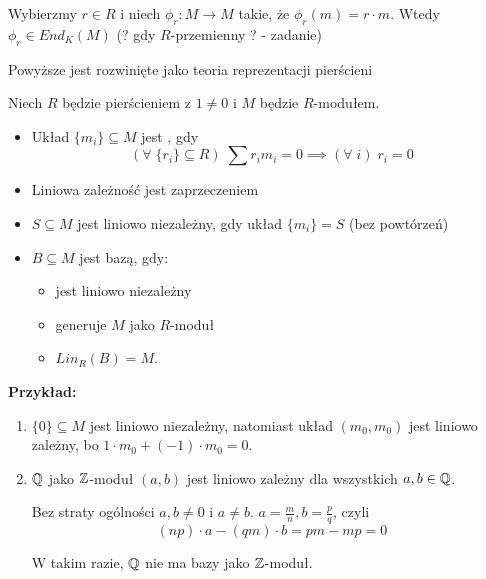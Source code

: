 Wybierzmy $r\in R$ i niech $\phi_r:M\to M$ takie, że $\phi_r(m)=r\cdot m$. Wtedy $\phi_r\in End_K(M)$ (? gdy $R$-przemienny ? - zadanie)

\begin{center}\end{center}

Powyższe jest rozwinięte jako teoria reprezentacji pierścieni

\begin{bbox}
Niech $R$ będzie pierścieniem z $1\neq 0$ i $M$ będzie $R$-modułem.

\begin{itemize}%
    \item[\PHtunny] Układ $\{m_i\}\subseteq M$ jest , gdy
    $$(\forall\;\{r_i\}\subseteq R)\;\sum r_im_i=0\implies(\forall\;i)\;r_i=0$$
    \item[\PHtunny] Liniowa zależność jest zaprzeczeniem
    \item[\PHtunny] $S\subseteq M$ jest liniowo niezależny, gdy układ $\{m_i\}=S$ (bez powtórzeń)
    \item[\PHtunny] $B\subseteq M$ jest bazą, gdy:
    \begin{itemize}
        \item jest liniowo niezależny
        \item generuje $M$ jako $R$-moduł
        \item $Lin_R(B)=M$.
    \end{itemize}
\end{itemize}

\end{bbox}

\textbf{Przykład:}

\begin{enumerate}
    \item $\{0\}\subseteq M$ jest liniowo niezależny, natomiast układ $(m_0,m_0)$ jest liniowo zależny, bo $1\cdot m_0+(-1)\cdot m_0=0$.
    \item $\mathbb{Q}$ jako $\mathbb{Z}$-moduł $(a, b)$ jest liniowo zależny dla wszystkich $a,b\in\mathbb{Q}$.

    Bez straty ogólności $a,b\neq 0$ i $a\neq b$. $a=\frac{m}{n},b=\frac{p}{q}$, czyli
    $$(np)\cdot a-(qm)\cdot b=pm-mp=0$$

    W takim razie, $\mathbb{Q}$ nie ma bazy jako $\mathbb{Z}$-moduł.
\end{enumerate}

